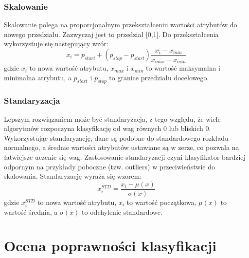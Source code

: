 \subsubsection{Skalowanie}
Skalowanie polega na proporcjonalnym przekształceniu wartości atrybutów do nowego przedziału. Zazwyczaj jest to przedział [0,1]. Do przekształcenia wykorzystuje się następujący wzór:
\[x_i=p_{start}+(p_{stop}-p_{start})\frac{x_i-x_{min}}{x_{max}-x_{min}}\]
gdzie $x_i$ to nowa wartość atrybutu, $x_{max}$ i $x_{min}$ to wartość maksymalna i minimalna atrybutu, a $p_{start}$ i $p_{stop}$ to granice przedziału docelowego.
\subsubsection{Standaryzacja}
Lepszym rozwiązaniem może być standaryzacja, z tego względu, że wiele algorytmów rozpoczyna klasyfikację od wag równych 0 lub bliskich 0. Wykorzystując standaryzację, dane są podobne do standardowego rozkładu normalnego, a średnie wartości atrybutów ustawiane są w zerze, co pozwala na łatwiejsze uczenie się wag. Zastosowanie standaryzacji czyni klasyfikator bardziej odpornym na przykłady poboczne (tzw. outliers) w przeciwieństwie do skalowania. Standaryzację wyraża się wzorem:
\[x_i^{STD} = \frac{x_i - \mu(x)}{\sigma(x)}\]
gdzie $x_i^{STD}$ to nowa wartość atrybutu, $x_i$ to wartość początkowa, $\mu(x)$ to wartość średnia, a $\sigma(x)$ to odchylenie standardowe.
\section{Ocena poprawności klasyfikacji}

